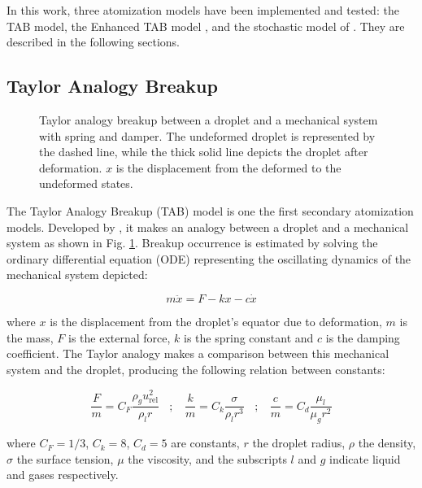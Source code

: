 In this work, three atomization models have been implemented and tested: the TAB model, the Enhanced TAB model , and the stochastic model of . They are described in the following sections.

\subsection{Taylor Analogy Breakup}


\begin{figure}[h!]
	\centering
	\caption{Taylor analogy breakup between a droplet and a mechanical system with spring and damper. The undeformed droplet is represented by the dashed line, while the thick solid line depicts the droplet after deformation. $x$ is the displacement from the deformed to the undeformed states.}
	\label{fig:TAB_droplet_deformation}
\end{figure}

The Taylor Analogy Breakup (TAB) model is one the first secondary atomization models. Developed by , it makes an analogy between a droplet and a mechanical system as shown in Fig. \ref{fig:TAB_droplet_deformation}. Breakup occurrence is estimated by solving the ordinary differential equation (ODE) representing the oscillating dynamics of the mechanical system depicted:

\begin{equation}
\label{ref:TAB_ODE_x}
m \ddot{x} = F - k x - c \dot{x}
\end{equation}

where $x$ is the displacement from the droplet's equator due to deformation, $m$ is the mass, $F$ is the external force, $k$ is the spring constant and $c$ is the damping coefficient. The Taylor analogy makes a comparison between this mechanical system and the droplet, producing the following relation between constants:

\begin{equation}
\frac{F}{m} = C_F \frac{\rho_g u_\mathrm{rel}^2}{\rho_l r} ~~~~ ; ~~~~ \frac{k}{m} = C_k \frac{\sigma}{\rho_l r^3} ~~~~ ; ~~~~ \frac{c}{m} = C_d \frac{\mu_l}{\mu_g r^2}
\end{equation}

where $C_F = 1/3$, $C_k = 8$, $C_d = 5$ are constants, $r$ the droplet radius, $\rho$ the density, $\sigma$ the surface tension, $\mu$ the viscosity, and the subscripts $l$ and $g$ indicate liquid and gases respectively. 

